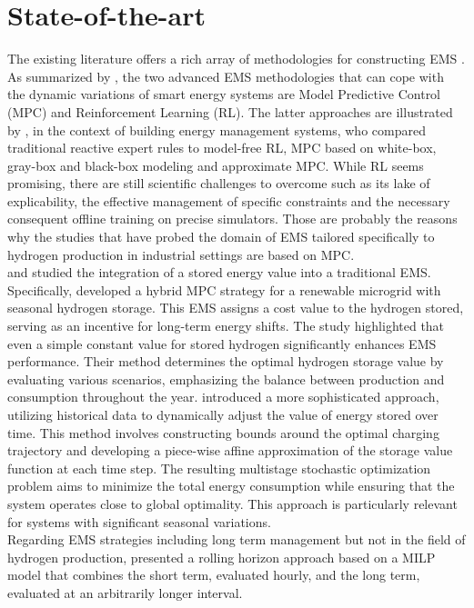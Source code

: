 \section{State-of-the-art}
The existing literature offers a rich array of methodologies for constructing EMS \citep{weitzel_energy_2018}. As summarized by \cite{alabi_strategic_2023}, the two advanced EMS methodologies that can cope with the dynamic variations of smart energy systems are Model Predictive Control (MPC) and Reinforcement Learning (RL). The latter approaches are illustrated by \cite{stoffel_evaluation_2023}, in the context of building energy management systems, who compared traditional reactive expert rules to model-free RL, MPC based on white-box, gray-box and black-box modeling and approximate MPC. While RL seems promising, there are still scientific challenges to overcome such as its lake of explicability, the effective management of specific constraints and the necessary consequent offline training on precise simulators. Those are probably the reasons why the studies that have probed the domain of EMS tailored specifically to hydrogen production in industrial settings are based on MPC.
\\
\cite{darivianakis_data-driven_2017} and \cite{thaler_hybrid_2023} studied the integration of a stored energy value into a traditional EMS. Specifically, \cite{thaler_hybrid_2023} developed a hybrid MPC strategy for a renewable microgrid with seasonal hydrogen storage. This EMS assigns a cost value to the hydrogen stored, serving as an incentive for long-term energy shifts. The study highlighted that even a simple constant value for stored hydrogen significantly enhances EMS performance. Their method determines the optimal hydrogen storage value by evaluating various scenarios, emphasizing the balance between production and consumption throughout the year.
\cite{darivianakis_data-driven_2017} introduced a more sophisticated approach, utilizing historical data to dynamically adjust the value of energy stored over time. This method involves constructing bounds around the optimal charging trajectory and developing a piece-wise affine approximation of the storage value function at each time step. The resulting multistage stochastic optimization problem aims to minimize the total energy consumption while ensuring that the system operates close to global optimality. This approach is particularly relevant for systems with significant seasonal variations.
\\
Regarding EMS strategies including long term management but not in the field of hydrogen production, \cite{cuisinier_new_2022,cuisinier_impact_2023} presented a rolling horizon approach based on a MILP model that combines the short term, evaluated hourly, and the long term, evaluated at an arbitrarily longer interval.
